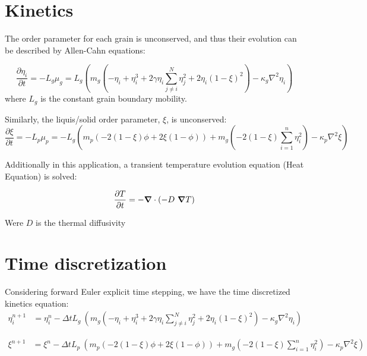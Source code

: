 \documentclass[10pt]{article}
\newcommand{\gv}[1]{\ensuremath{\mbox{\boldmath$ #1 $}}}
\newcommand{\grad}[1]{\gv{\nabla} #1}
\begin{document}
\section{Kinetics}
The order parameter for each grain is unconserved, and thus their evolution can be described by Allen-Cahn equations:

\begin{equation}
\frac{\partial \eta_i}{\partial t} = -L_g \mu_g = L_g \left( m_g \left( -\eta_i + \eta_i^3 + 2 \gamma \eta_i \sum_{j \ne i}^N \eta_j^2 +2\eta_i\left( 1-\xi \right)^2  \right) - \kappa_g \nabla^2 \eta_i \right)
\end{equation}
where $L_g$ is the constant grain boundary mobility. 

Similarly, the liquis/solid order parameter, $\xi$, is unconserved:
\begin{equation}
\frac{\partial \xi}{\partial t} = -L_p \mu_p = -L_g \left( m_p \left(  -2 \left( 1- \xi \right) \phi +2 \xi \left( 1- \phi \right)  \right) + m_g \left( -2 \left( 1-\xi \right) \sum_{i=1}^{n} \eta_i^2 \right) - \kappa_p \nabla^2 \xi \right)
\end{equation}

Additionally in this application, a transient temperature evolution equation (Heat Equation) is solved:

\begin{equation}
\frac{\partial T}{\partial t} = -\grad \cdot (-D~\grad T) 
\end{equation}

Were $D$ is the thermal diffusivity


\section{Time discretization}
Considering forward Euler explicit time stepping, we have the time discretized kinetics equation:
\begin{align}
 \eta_i^{n+1} &= \eta_i^{n} - \Delta t L_g~\left( m_g \left( -\eta_i + \eta_i^3 + 2 \gamma \eta_i \sum_{j \ne i}^N \eta_j^2 +2\eta_i\left( 1-\xi \right)^2  \right) - \kappa_g \nabla^2 \eta_i \right)
\end{align}


 \begin{align}
 \xi^{n+1} &= \xi^{n} - \Delta t L_p~\left( m_p \left(  -2 \left( 1- \xi \right) \phi +2 \xi \left( 1- \phi \right)  \right) + m_g \left( -2 \left( 1-\xi \right) \sum_{i=1}^{n} \eta_i^2 \right) - \kappa_p \nabla^2 \xi \right)
\end{align}
\end{document}
